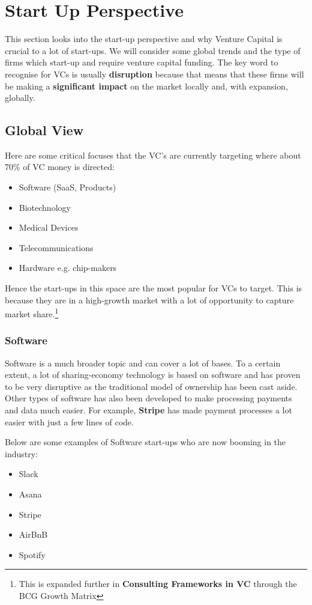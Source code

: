 \documentclass[a4paper]{article}
\begin{document}
{\newpage
\section{Start Up Perspective}
This section looks into the start-up perspective and why Venture Capital is crucial to a lot of start-ups. We will consider some global trends and the type of firms which start-up and require venture capital funding. The key word to recognise for VCs is usually \textbf{disruption} because that means that these firms will be making a \textbf{significant impact} on the market locally and, with expansion, globally.

\subsection{Global View}
Here are some critical focuses that the VC's are currently targeting where about 70\% of VC money is directed:
\begin{itemize}
	\item Software (SaaS, Products)
	\item Biotechnology
	\item Medical Devices
	\item Telecommunications
	\item Hardware e.g. chip-makers
\end{itemize}
\vspace{5pt}
Hence the start-ups in this space are the most popular for VCs to target. This is because they are in a high-growth market with a lot of opportunity to capture market share.\footnote{This is expanded further in \textbf{Consulting Frameworks in VC} through the BCG Growth Matrix}

\subsubsection{Software}
Software is a much broader topic and can cover a lot of bases. To a certain extent, a lot of sharing-economy technology is based on software and has proven to be very disruptive as the traditional model of ownership has been cast aside. Other types of software has also been developed to make processing payments and data much easier. For example, \textbf{Stripe} has made payment processes a lot easier with just a few lines of code.

\vspace{5pt}
\noindent Below are some examples of Software start-ups who are now booming in the industry:
\begin{itemize}
	\item Slack
	\item Asana
	\item Stripe
	\item AirBnB
	\item Spotify
\end{itemize}

}
\end{document}
